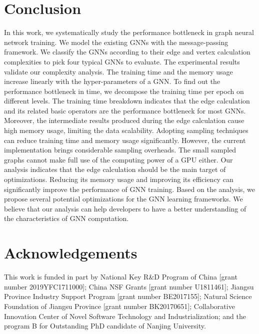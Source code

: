 \section{Conclusion}
\label{sec:conclusion}

In this work, we systematically study the performance bottleneck in graph neural network training.
We model the existing GNNs with the message-passing framework.
We classify the GNNs according to their edge and vertex calculation complexities to pick four typical GNNs to evaluate.
The experimental results validate our complexity analysis.
The training time and the memory usage increase linearly with the hyper-parameters of a GNN.
To find out the performance bottleneck in time, we decompose the training time per epoch on different levels.
The training time breakdown indicates that the edge calculation and its related basic operators are the performance bottleneck for most GNNs.
Moreover, the intermediate results produced during the edge calculation cause high memory usage, limiting the data scalability.
Adopting sampling techniques can reduce training time and memory usage significantly.
However, the current implementation brings considerable sampling overheads.
The small sampled graphs cannot make full use of the computing power of a GPU either.
Our analysis indicates that the edge calculation should be the main target of optimizations.
Reducing its memory usage and improving its efficiency can significantly improve the performance of GNN training.
Based on the analysis, we propose several potential optimizations for the GNN learning frameworks.
We believe that our analysis can help developers to have a better understanding of the characteristics of GNN computation.

\section*{Acknowledgements}

This work is funded in part by National Key R\&D Program of China [grant number 2019YFC1711000]; China NSF Grants [grant number U1811461]; Jiangsu Province Industry Support Program [grant number BE2017155]; Natural Science Foundation of Jiangsu Province [grant number BK20170651]; Collaborative Innovation Center of Novel Software Technology and Industrialization; and the program B for Outstanding PhD candidate of Nanjing University.
